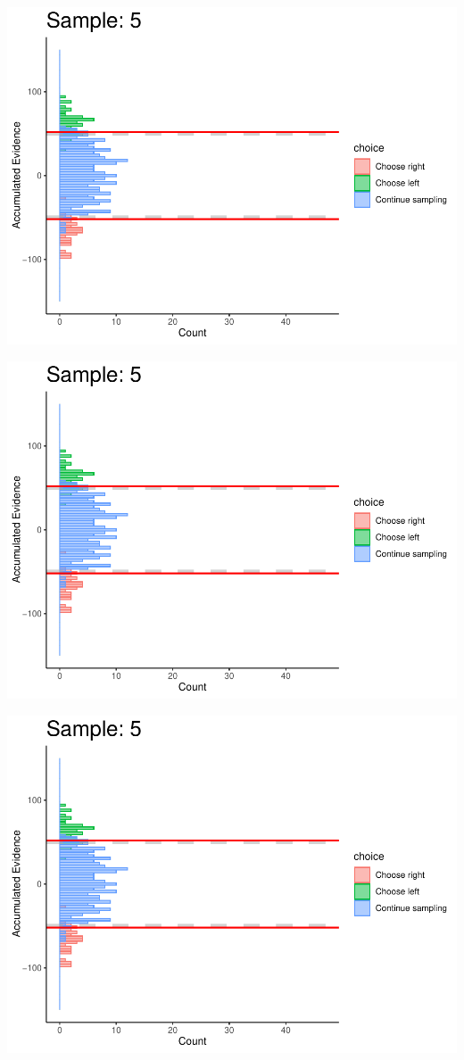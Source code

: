\documentclass[
]{book}
\begin{document}
\begin{center}\includegraphics[width=0.8\linewidth]{LateNightBayes_files/figure-latex/fixed_dcb-43} \end{center}

\begin{center}\includegraphics[width=0.8\linewidth]{LateNightBayes_files/figure-latex/fixed_dcb-44} \end{center}

\begin{center}\includegraphics[width=0.8\linewidth]{LateNightBayes_files/figure-latex/fixed_dcb-45} \end{center}
\end{document}
